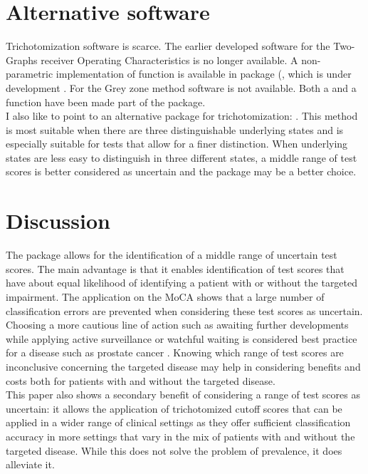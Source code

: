 \documentclass[
  nojss]{jss}
\begin{document}
\hypertarget{alternative-software}{%
\section{Alternative software}\label{alternative-software}}

Trichotomization software is scarce. The earlier developed software for
the Two-Graphs receiver Operating Characteristics
\citep{greiner_two-graph_1995, greiner_two-graph_1996} is no longer
available. A non-parametric implementation of function  is
available in package (, which is under development
\citep{brasil_diagnosismed_2018}. For the Grey zone method
\citep{coste_gray_2006, coste_grey_2003} software is not available. Both
a  and a  function have been made part of
the  package.\\
I also like to point to an alternative  package for
trichotomization: 
\citep{perez-jaume_thresholdroc:_2017}. This method is most suitable
when there are three distinguishable underlying states and is especially
suitable for tests that allow for a finer distinction. When underlying
states are less easy to distinguish in three different states, a middle
range of test scores is better considered as uncertain and the package
 may be a better choice.

\hypertarget{discussion}{%
\section{Discussion}\label{discussion}}

The  package allows for the identification of a
middle range of uncertain test scores. The main advantage is that it
enables identification of test scores that have about equal likelihood
of identifying a patient with or without the targeted impairment. The
application on the MoCA shows that a large number of classification
errors are prevented when considering these test scores as uncertain.
Choosing a more cautious line of action such as awaiting further
developments while applying active surveillance or watchful waiting is
considered best practice for a disease such as prostate cancer
\citep{bangma_active_2013}. Knowing which range of test scores are
inconclusive concerning the targeted disease may help in considering
benefits and costs both for patients with and without the targeted
disease.\\
This paper also shows a secondary benefit of considering a range of test
scores as uncertain: it allows the application of trichotomized cutoff
scores that can be applied in a wider range of clinical settings as they
offer sufficient classification accuracy in more settings that vary in
the mix of patients with and without the targeted disease. While this
does not solve the problem of prevalence, it does alleviate it.
\end{document}

